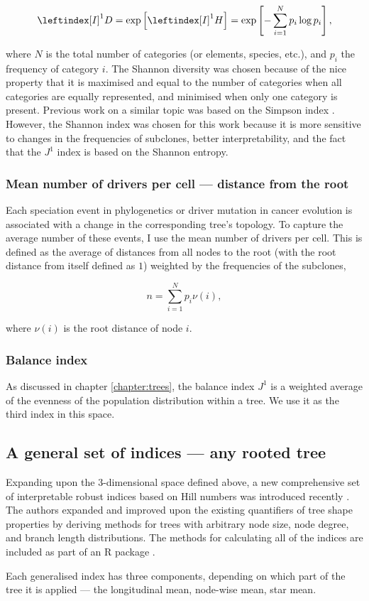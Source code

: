 \begin{equation}
    \leftindex[I]^1{D} = \exp\left[\leftindex[I]^1{H}\right] =
    \exp\left[-\sum_{i=1}^N p_i \log p_i\right],
\end{equation}

where $N$ is the total number of categories (or elements, species, etc.), and
$p_i$ the frequency of category $i$. The Shannon diversity was chosen because of
the nice property that it is maximised and equal to the number of categories
when all categories are equally represented, and minimised when only one
category is present. Previous work on a similar topic \cite{noble_spatial_2022}
was based on the Simpson index \cite{simpson_measurement_1949}. However, the
Shannon index was chosen for this work because it is more sensitive to changes
in the frequencies of subclones, better interpretability, and the fact that the
$J^1$ index is based on the Shannon entropy.

\subsubsection{Mean number of drivers per cell --- distance from the root}
Each speciation event in phylogenetics or driver mutation in cancer evolution is
associated with a change in the corresponding tree's topology. To capture the
average number of these events, I use the mean number of drivers per cell. This
is defined as the average of distances from all nodes to the root (with the root
distance from itself defined as $1$) weighted by the frequencies of the
subclones,

\begin{equation}
    n = \sum_{i=1}^N p_i \nu(i),
\end{equation}

where $\nu(i)$ is the root distance of node $i$.

\subsubsection{Balance index}
As discussed in chapter \ref{chapter:trees}, the balance index $J^1$ is a
weighted average of the evenness of the population distribution within a tree.
We use it as the third index in this space.

\subsection{A general set of indices --- any rooted tree}
Expanding upon the $3$-dimensional space defined above, a new comprehensive set
of interpretable robust indices based on Hill numbers was introduced recently
\cite{noble_new_2023}. The authors expanded and improved upon the existing
quantifiers of tree shape properties by deriving methods for trees with
arbitrary node size, node degree, and branch length distributions. The methods
for calculating all of the indices are included as part of an R package
\cite{kimverity_kimverityruiindices_2023}.\par Each generalised index has three
components, depending on which part of the tree it is applied --- the
longitudinal mean, node-wise mean, star mean.

